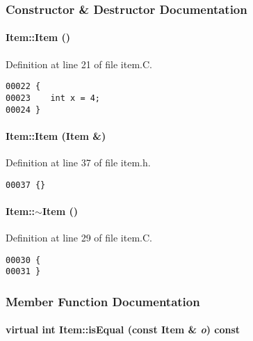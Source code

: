 \subsubsection{Constructor \& Destructor Documentation}
\label{Item_a0}
\paragraph{\setlength{\rightskip}{0pt plus 5cm}Item::Item ()}\hfill



Definition at line 21 of file item.C.\small\begin{verbatim}00022 {
00023    int x = 4;
00024 }
\end{verbatim}\normalsize 
\label{Item_a1}
\paragraph{\setlength{\rightskip}{0pt plus 5cm}Item::Item (Item \&)\hspace{0.3cm}{\tt  [inline]}}\hfill



Definition at line 37 of file item.h.\small\begin{verbatim}00037 {}
\end{verbatim}\normalsize 
\label{Item_a2}
\paragraph{\setlength{\rightskip}{0pt plus 5cm}Item::$\sim$Item ()\hspace{0.3cm}{\tt  [virtual]}}\hfill



Definition at line 29 of file item.C.\small\begin{verbatim}00030 {
00031 }
\end{verbatim}\normalsize 


\subsubsection{Member Function Documentation}
\label{Item_a5}
\paragraph{\setlength{\rightskip}{0pt plus 5cm}virtual int Item::is\-Equal (const Item \& {\em o}) const\hspace{0.3cm}{\tt  [pure virtual]}}\hfill



